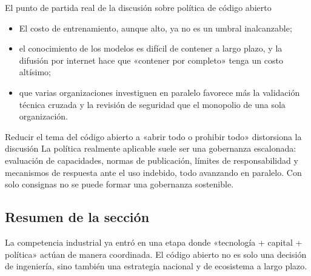 \begin{importantbox}{El punto de partida real de la discusión sobre política de código abierto}
\begin{itemize}[leftmargin=1.5em]
    \item El costo de entrenamiento, aunque alto, ya no es un umbral inalcanzable;
    \item el conocimiento de los modelos es difícil de contener a largo plazo, y la difusión por internet hace que «contener por completo» tenga un costo altísimo;
    \item que varias organizaciones investiguen en paralelo favorece más la validación técnica cruzada y la revisión de seguridad que el monopolio de una sola organización.
\end{itemize}
\end{importantbox}

\begin{warningbox}{Reducir el tema del código abierto a «abrir todo o prohibir todo» distorsiona la discusión}
La política realmente aplicable suele ser una gobernanza escalonada: evaluación de capacidades, normas de publicación, límites de responsabilidad y mecanismos de respuesta ante el uso indebido, todo avanzando en paralelo. Con solo consignas no se puede formar una gobernanza sostenible.
\end{warningbox}

\subsection{Resumen de la sección}

La competencia industrial ya entró en una etapa donde «tecnología + capital + política» actúan de manera coordinada. El código abierto no es solo una decisión de ingeniería, sino también una estrategia nacional y de ecosistema a largo plazo.

